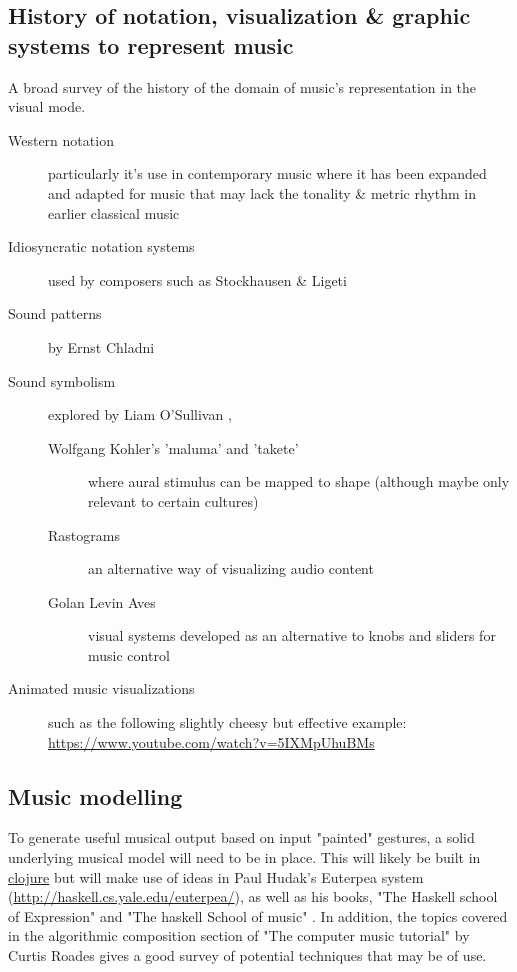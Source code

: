 \documentclass[a4paper,twoside,twocolumn]{article}
\begin{document}
\subsection{History of notation, visualization \& graphic systems to represent music}
\label{sec:org3219f2b}
A broad survey of the history of the domain of music's representation in the visual mode.
\begin{description}
\item[{Western notation}] particularly it's use in contemporary music where it has been expanded and adapted for music that may lack the tonality \& metric rhythm in earlier classical music
\item[{Idiosyncratic notation systems}] used by composers such as Stockhausen \& Ligeti
\item[{Sound patterns}] by Ernst Chladni
\item[{Sound symbolism}] explored by Liam O'Sullivan \cite{boland_visualizing_2011}, \cite{sullivan_it_2013}  
\begin{description}
\item[{Wolfgang Kohler's 'maluma' and 'takete'}] where aural stimulus can be mapped to shape (although maybe only relevant to certain cultures)
\item[{Rastograms}] an alternative way of visualizing audio content
\item[{Golan Levin Aves}] visual systems developed as an alternative to knobs and sliders for music control
\end{description}

\item[{Animated music visualizations}] such as the following slightly cheesy but effective example: \url{https://www.youtube.com/watch?v=5IXMpUhuBMs}
\end{description}

\subsection{Music modelling}
\label{sec:org2c4cc7b}
To generate useful musical output based on input "painted" gestures, a solid underlying musical model will need to be in place. This will likely be built in \href{https://clojure.org}{clojure} but will make use of ideas in Paul Hudak's Euterpea system (\url{http://haskell.cs.yale.edu/euterpea/}), as well as his books, "The Haskell school of Expression" \cite{hudak_haskell_2000} and "The haskell School of music" \cite{hudak_haskell_2008}. In addition, the topics covered in the algorithmic composition section of "The computer music tutorial" by Curtis Roades gives a good survey of potential techniques that may be of use. 
\end{document}
